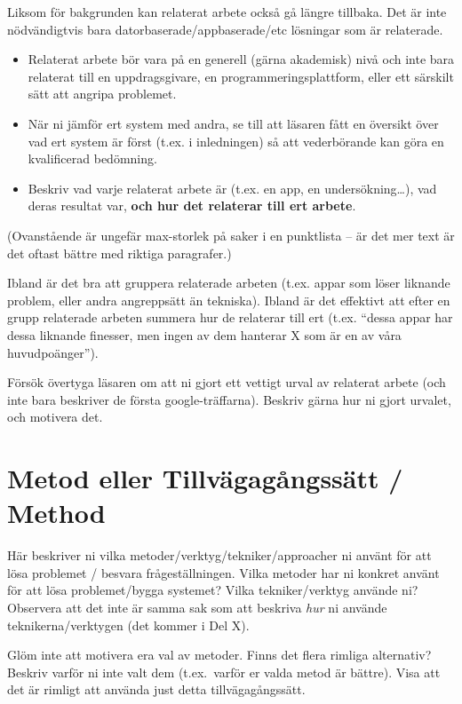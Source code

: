\documentclass[a4paper,12pt]{article}
\begin{document}
Liksom för bakgrunden kan relaterat arbete också gå längre tillbaka. Det är inte nödvändigtvis bara datorbaserade/appbaserade/etc lösningar som är relaterade.

\begin{itemize}
	\item
	Relaterat arbete bör vara på en generell (gärna akademisk) nivå och inte bara relaterat till en uppdragsgivare, en programmeringsplattform, eller ett särskilt sätt att angripa problemet.
	\item
	När ni jämför ert system med andra, se till att läsaren fått en översikt över vad ert system är först (t.ex. i inledningen) så att vederbörande kan göra en kvalificerad bedömning.
\item Beskriv vad varje relaterat arbete är (t.ex. en app, en undersökning\ldots), vad deras resultat var, \textbf{och hur det relaterar till ert arbete}.
\end{itemize}

(Ovanstående är ungefär max-storlek på saker i en punktlista -- är det mer text är det oftast bättre med riktiga paragrafer.)

Ibland är det bra att gruppera relaterade arbeten (t.ex. appar som löser liknande problem, eller andra angreppsätt än tekniska).
Ibland är det effektivt att efter en grupp relaterade arbeten summera hur de relaterar till ert (t.ex. ``dessa appar har dessa liknande finesser, men ingen av dem hanterar X som är en av våra huvudpoänger'').

Försök övertyga läsaren om att ni gjort ett vettigt urval av relaterat arbete (och inte bara beskriver de första google-träffarna). Beskriv gärna hur ni gjort urvalet, och motivera det.

\section{Metod eller Tillvägagångssätt / Method}
Här beskriver ni vilka metoder/verktyg/tekniker/approacher ni använt för att lösa problemet / besvara frågeställningen.  Vilka metoder har ni konkret använt för att lösa problemet/bygga systemet?  Vilka tekniker/verktyg använde ni? Observera att det inte är samma sak som att beskriva \emph{hur} ni använde teknikerna/verktygen (det kommer i Del X).


Glöm inte att motivera era val av metoder. Finns det flera rimliga alternativ? Beskriv varför ni inte valt dem (t.ex.~varför er valda metod är bättre).
Visa att det är rimligt att använda just detta tillvägagångssätt.
\end{document}

